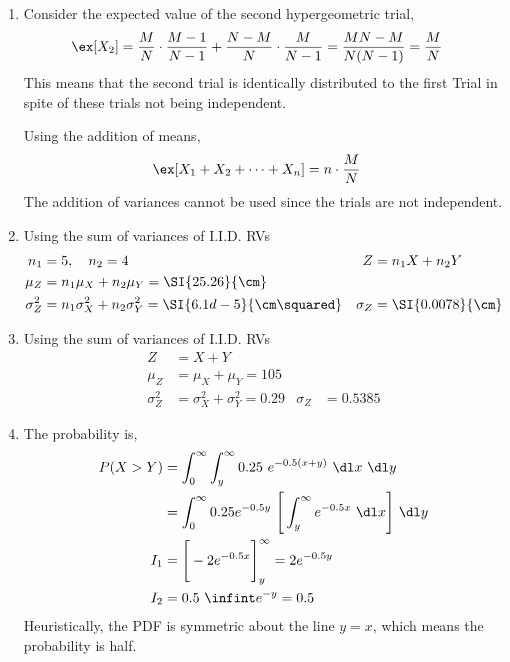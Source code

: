 \begin{enumerate}
    \item Consider the expected value of the second hypergeometric trial,
          \begin{align}
              \ex[X_2] & = \frac{M}{N} \cdot \frac{M-1}{N-1} +
              \frac{N-M}{N} \cdot \frac{M}{N-1}
              = \frac{MN - M}{N(N-1)} = \frac{M}{N}
          \end{align}
          This means that the second trial is identically distributed to the first Trial
          in spite of these trials not being independent. \par
          Using the addition of means,
          \begin{align}
              \ex[X_1 + X_2 + \dots + X_n] & = n \cdot \frac{M}{N}
          \end{align}
          The addition of variances cannot be used since the trials are not independent.

    \item Using the sum of variances of I.I.D. RVs
          \begin{align}
              n_1                        & = 5, \quad n_2 = 4                      &
              Z                          & = n_1X + n_2Y                             \\
              \mu_Z                      & = n_1\mu_X + n_2\mu_Y = \SI{25.26}{\cm}   \\
              \sigma^2_Z                 & = n_1 \sigma^2_X + n_2 \sigma^2_Y
              = \SI{6.1d-5}{\cm\squared} &
              \sigma_Z                   & = \SI{0.0078}{\cm}
          \end{align}

    \item Using the sum of variances of I.I.D. RVs
          \begin{align}
              Z          & = X + Y                     \\
              \mu_Z      & = \mu_X + \mu_Y = 105       \\
              \sigma^2_Z & =  \sigma^2_X +  \sigma^2_Y
              = 0.29     &
              \sigma_Z   & = 0.5385
          \end{align}

    \item The probability is,
          \begin{align}
              P(X > Y) & = \int_{0}^{\infty} \int_{y}^{\infty} 0.25\ e^{-0.5(x+y)}
              \ \dl x\ \dl y                                                        \\
                       & = \int_{0}^{\infty} 0.25e^{-0.5y}\ \Bigg[\int_{y}^{\infty}
              e^{-0.5x} \ \dl x\Bigg]\ \dl y                                        \\
              I_1      & = \Bigg[-2e^{-0.5x}\Bigg]_y^\infty = 2e^{-0.5y}            \\
              I_2      & = 0.5\ \infint e^{-y} = 0.5
          \end{align}
          Heuristically, the PDF is symmetric about the line $ y=x $, which means the
          probability is half.


\end{enumerate}
